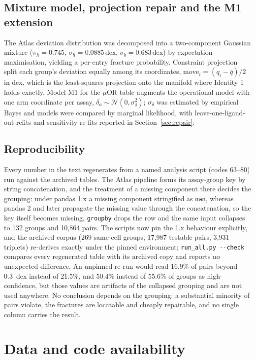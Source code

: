 ﻿\documentclass[11pt,a4paper]{article}
\newcommand{\dex}{\ensuremath{\,\mathrm{dex}}}
\begin{document}
\subsection{Mixture model, projection repair and the M1 extension}

The Atlas deviation distribution was decomposed into a two-component Gaussian mixture ($\pi_h=0.745$, $\sigma_h=0.0885\dex$, $\sigma_b=0.683\dex$) by expectation--maximisation, yielding a per-entry fracture probability. Constraint projection split each group's deviation equally among its coordinates, $\mathrm{move}_i=(q_i-\bar q)/2$ in dex, which is the least-squares projection onto the manifold where Identity 1 holds exactly. Model M1 for the $\mu$OR table augments the operational model with one arm coordinate per assay, $\delta_a\sim\mathcal{N}(0,\sigma_\delta^2)$; $\sigma_\delta$ was estimated by empirical Bayes and models were compared by marginal likelihood, with leave-one-ligand-out refits and sensitivity re-fits reported in Section~\ref{sec:repair}.

\subsection{Reproducibility}

Every number in the text regenerates from a named analysis script (codes 63--80) run against the archived tables. The Atlas pipeline forms its assay-group key by string concatenation, and the treatment of a missing component there decides the grouping: under pandas 1.x a missing component stringified as \texttt{nan}, whereas pandas 2 and later propagate the missing value through the concatenation, so the key itself becomes missing, \texttt{groupby} drops the row and the same input collapses to 132 groups and 10{,}864 pairs. The scripts now pin the 1.x behaviour explicitly, and the archived corpus (269 same-cell groups, 17{,}987 testable pairs, 3{,}931 triplets) re-derives exactly under the pinned environment; \texttt{run\_all.py -{}-check} compares every regenerated table with its archived copy and reports no unexpected difference. An unpinned re-run would read 16.9\% of pairs beyond 0.3~dex instead of 21.5\%, and 50.4\% instead of 55.6\% of groups as high-confidence, but those values are artifacts of the collapsed grouping and are not used anywhere. No conclusion depends on the grouping: a substantial minority of pairs violate, the fractures are locatable and cheaply repairable, and no single column carries the result.

\section*{Data and code availability}
\end{document}
